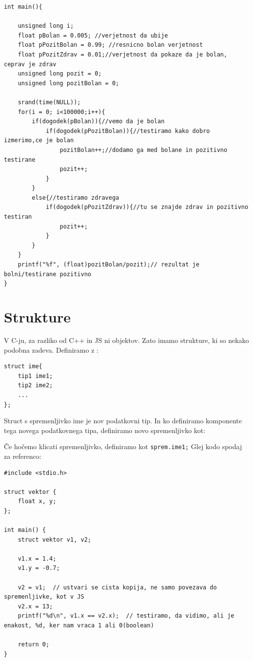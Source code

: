 \documentclass[a4paper, 12pt]{article}
\begin{document}
\begin{lstlisting}
int main(){

    unsigned long i;
	float pBolan = 0.005; //verjetnost da ubije
	float pPozitBolan = 0.99; //resnicno bolan verjetnost
	float pPozitZdrav = 0.01;//verjetnost da pokaze da je bolan, ceprav je zdrav
	unsigned long pozit = 0;
	unsigned long pozitBolan = 0;
	
	srand(time(NULL));
	for(i = 0; i<100000;i++){
		if(dogodek(pBolan)){//vemo da je bolan
			if(dogodek(pPozitBolan)){//testiramo kako dobro izmerimo,ce je bolan
				pozitBolan++;//dodamo ga med bolane in pozitivno testirane
				pozit++;
			}
		}
		else{//testiramo zdravega
			if(dogodek(pPozitZdrav)){//tu se znajde zdrav in pozitivno testiran
				pozit++;
			}
		}
	}
	printf("%f", (float)pozitBolan/pozit);// rezultat je bolni/testirane pozitivno
}
\end{lstlisting}

\section{Strukture}

V C-ju, za razliko od C++ in JS ni objektov. Zato imamo strukture, ki so nekako podobna zadeva. Definiramo z :
\begin{lstlisting}
struct ime{
	tip1 ime1;
	tip2 ime2;
	...
};
\end{lstlisting}
Struct s spremenljivko ime je nov podatkovni tip. In ko definiramo komponente tega novega podatkovnega tipa, definiramo novo spremenljivko kot:

Če hočemo klicati spremenljivko, definiramo kot \lstinline|sprem.ime1;| Glej kodo spodaj za referenco:

\begin{lstlisting}
#include <stdio.h>

struct vektor {
	float x, y;		
};

int main() {
	struct vektor v1, v2;

	v1.x = 1.4;	
	v1.y = -0.7;

	v2 = v1;  // ustvari se cista kopija, ne samo povezava do spremenljivke, kot v JS
	v2.x = 13;
	printf("%d\n", v1.x == v2.x);  // testiramo, da vidimo, ali je enakost, %d, ker nam vraca 1 ali 0(boolean)
	
	return 0;
}
\end{lstlisting}
\end{document}
